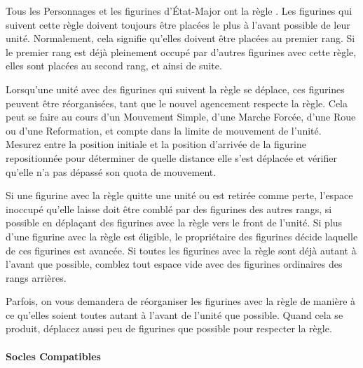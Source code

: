 Tous les Personnages et les figurines d'État-Major ont la règle \frontrank{}. Les figurines qui suivent cette règle doivent toujours être placées le plus à l'avant possible de leur unité. Normalement, cela signifie qu'elles doivent être placées au premier rang. Si le premier rang est déjà pleinement occupé par d'autres figurines avec cette règle, elles sont placées au second rang, et ainsi de suite.

Lorsqu'une unité avec des figurines qui suivent la règle \frontrank{} se déplace, ces figurines peuvent être réorganisées, tant que le nouvel agencement respecte la règle. Cela peut se faire au cours d'un Mouvement Simple, d'une Marche Forcée, d'une Roue ou d'une Reformation, et compte dans la limite de mouvement de l'unité. Mesurez entre la position initiale et la position d'arrivée de la figurine repositionnée pour déterminer de quelle distance elle s'est déplacée et vérifier qu'elle n'a pas dépassé son quota de mouvement.

Si une figurine avec la règle \frontrank{} quitte une unité ou est retirée comme perte, l'espace inoccupé qu'elle laisse doit être comblé par des figurines des autres rangs, si possible en déplaçant des figurines avec la règle \frontrank{} vers le front de l'unité. Si plus d'une figurine avec la règle \frontrank{} est éligible, le propriétaire des figurines décide laquelle de ces figurines est avancée. Si toutes les figurines avec la règle \frontrank{} sont déjà autant à l'avant que possible, comblez tout espace vide avec des figurines ordinaires des rangs arrières.

Parfois, on vous demandera de réorganiser les figurines avec la règle \frontrank{} de manière à ce qu'elles soient toutes autant à l'avant de l'unité que possible. Quand cela se produit, déplacez aussi peu de figurines que possible pour respecter la règle.

\paragraph{Socles Compatibles}

